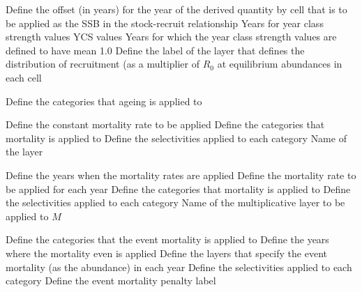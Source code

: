  {Define the offset (in years) for the year of the derived quantity by cell that is to be applied as the SSB in the stock-recruit relationship}
 {Years for year class strength values}
 {YCS values}
 {Years for which the year class strength values are defined to have mean 1.0}
 {Define the label of the layer that defines the distribution of recruitment (as a multiplier of $R_0$ at equilibrium abundances in each cell}
\par\textbf{}\par
{} {Define the categories that ageing is applied to}
\par\textbf{}\par
{} {Define the constant mortality rate to be applied}
 {Define the categories that mortality is applied to}
 {Define the selectivities applied to each category}
 {Name of the layer}
\par\textbf{}\par
{} {Define the years when the mortality rates are applied}
 {Define the mortality rate to be applied for each year}
 {Define the categories that mortality is applied to}
 {Define the selectivities applied to each category}
 {Name of the multiplicative layer to be applied to $M$}
\par\textbf{}\par
{} {Define the categories that the event mortality is applied to}
 {Define the years where the mortality even is applied}
 {Define the layers that specify the event mortality (as the abundance) in each year}
 {Define the selectivities applied to each category}
 {Define the event mortality penalty label}
\par\textbf{}\par
{}
